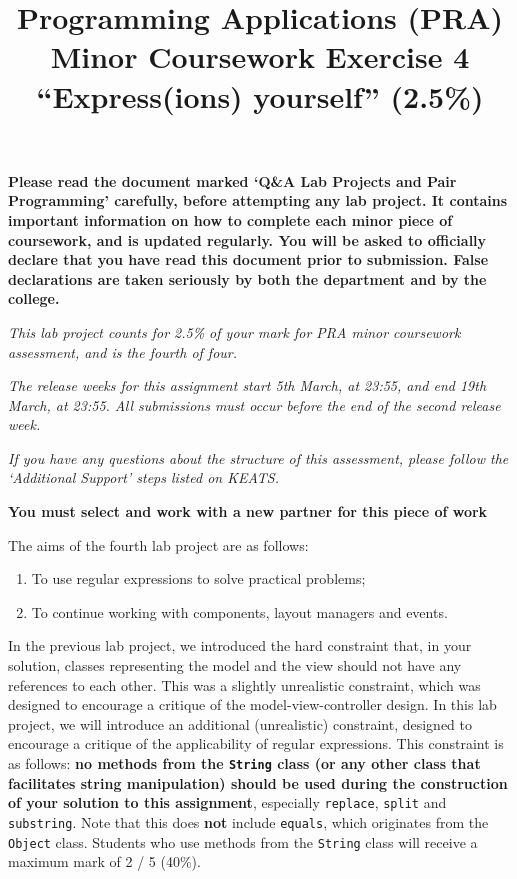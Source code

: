 \documentclass[11pt]{article}
\title{Programming Applications (PRA) \\ Minor Coursework Exercise 4 \\
``Express(ions) yourself'' (2.5\%)}
\date{}                                           %
\begin{document}
\maketitle


\textbf{Please read the document marked `Q\&A Lab Projects and Pair Programming' carefully, before attempting any lab project. It contains important information on how to complete each minor piece of coursework, and is updated regularly. You will be asked to officially declare that you have read this document prior to submission. False declarations are taken seriously by both the department and by the college.}

\emph{This lab project counts for 2.5\% of your mark for PRA minor coursework assessment, and is the fourth of four.}

\emph{The release weeks for this assignment start 5th March, at 23:55, and end 19th March, at 23:55. All submissions must occur before the end of the second release week.}

\emph{If you have any questions about the structure of this assessment, please follow the `Additional Support' steps listed on KEATS.}

\textbf{You must select and work with a new partner for this piece of work}

The aims of the fourth lab project are as follows:

\begin{enumerate}
	
	\item To use regular expressions to solve practical problems;
	
	\item To continue working with components, layout managers and events.
	
\end{enumerate}

In the previous lab project, we introduced the hard constraint that, in your solution, classes representing the model and the view should not have any references to each other. This was a slightly unrealistic constraint, which was designed to encourage a critique of the model-view-controller design. In this lab project, we will introduce an additional (unrealistic) constraint, designed to encourage a critique of the applicability of regular expressions. This constraint is as follows: \textbf{no methods from the \texttt{String} class (or any other class that facilitates string manipulation) should be used during the construction of your solution to this assignment}, especially \texttt{replace}, \texttt{split} and \texttt{substring}. Note that this does \textbf{not} include \texttt{equals}, which originates from the \texttt{Object} class. Students who use methods from the \texttt{String} class will receive a maximum mark of 2 / 5 (40\%).
\end{document}
